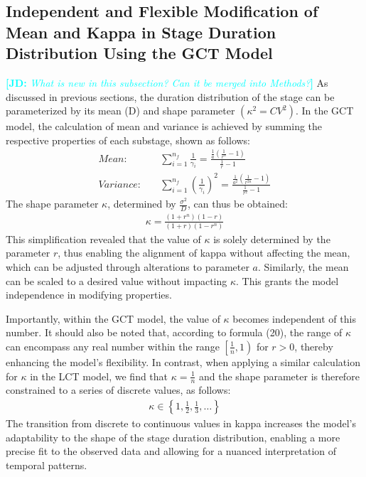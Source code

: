 \documentclass[12pt]{article}
\newcommand{\comment}{\showcomment}
\newcommand{\showcomment}[3]{\textcolor{#1}{\textbf{[#2: }\textsl{#3}\textbf{]}}}
\newcommand{\jd}[1]{\comment{cyan}{JD}{#1}}
\begin{document}
\subsection{Independent and Flexible Modification of Mean and Kappa in Stage Duration Distribution Using the GCT Model}
\jd{What is new in this subsection? Can it be merged into Methods?}
As discussed in previous sections, the duration distribution of the stage can be parameterized by its mean (D) and shape parameter $(\kappa^2 = CV^2)$. In the GCT model, the calculation of mean and variance is achieved by summing the respective properties of each substage, shown as follows:
\begin{align}
    Mean: \quad  &\sum_{i=1}^{n_f} \frac{1}{\gamma_i} = \frac{\frac{1}{a} (\frac{1}{r^n} - 1)}{\frac{1}{r} -1} \\
    Variance: \quad &\sum_{i=1}^{n_f} \left(\frac{1}{\gamma_i} \right)^2 = \frac{\frac{1}{a^2} (\frac{1}{r^{2n}} - 1)}{\frac{1}{r^2} -1}
\end{align}
The shape parameter $\kappa$, determined by $\frac{\sigma^2}{D}$, can thus be obtained:
\begin{align}
    \kappa = \frac{(1+r^{n}) (1-r)}{(1+r) (1-r^{n})}
\end{align}
This simplification revealed that the value of $\kappa$ is solely determined by the parameter $r$, thus enabling the alignment of kappa without affecting the mean, which can be adjusted through alterations to parameter $a$. Similarly, the mean can be scaled to a desired value without impacting $\kappa$. This grants the model independence in modifying properties.

Importantly, within the GCT model, the value of $\kappa$ becomes independent of this number. It should also be noted that, according to formula (20), the range of $\kappa$ can encompass any real number within the range $\left[ \frac{1}{n}, 1 \right)$ for $r > 0$, thereby enhancing the model's flexibility. In contrast, when applying a similar calculation for $\kappa$ in the LCT model, we find that $\kappa = \frac{1}{n}$ and the shape parameter is therefore constrained to a series of discrete values, as follows:
\begin{align*}
    \kappa \in \left\{ 1, \frac{1}{2}, \frac{1}{3}, \dots \right\}
\end{align*}
The transition from discrete to continuous values in kappa increases the model's adaptability to the shape of the stage duration distribution, enabling a more precise fit to the observed data and allowing for a nuanced interpretation of temporal patterns.
\end{document}
